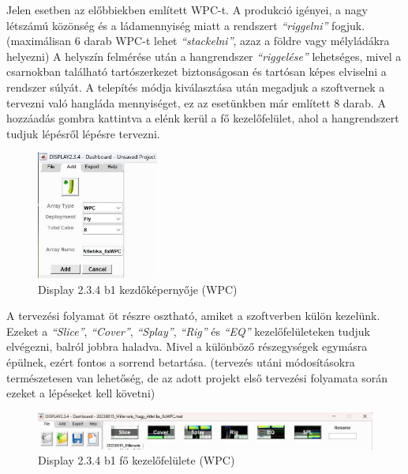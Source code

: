 Jelen esetben az előbbiekben említett WPC-t. A produkció igényei, a nagy létszámú közönség és a ládamennyiség miatt a rendszert
\textit{``riggelni''} fogjuk. (maximálisan 6 darab WPC-t lehet \textit{``stackelni''}, azaz a földre vagy mélyládákra helyezni)
A helyszín felmérése után a hangrendszer \textit{``riggelése''} lehetséges, mivel a csarnokban található tartószerkezet biztonságosan
és tartósan képes elviselni a rendszer súlyát.
A telepítés módja kiválasztása után megadjuk a szoftvernek a tervezni való hangláda mennyiséget, ez az esetünkben már említett 8 darab.
A hozzáadás gombra kattintva a elénk kerül a fő kezelőfelület, ahol a hangrendszert tudjuk lépésről lépésre tervezni.
\begin{figure}[H]
	\centering
	\includegraphics[width=40mm, keepaspectratio]{figures/display_wpc_0.jpg}
	\caption{Display 2.3.4 b1 kezdőképernyője (WPC)}\label{fig:display_wpc_0}
\end{figure}
A tervezési folyamat öt részre osztható, amiket a szoftverben külön kezelünk.
Ezeket a \textit{``Slice''}, \textit{``Cover''}, \textit{``Splay''}, \textit{``Rig''} és \textit{``EQ''} kezelőfelületeken tudjuk elvégezni,
balról jobbra haladva. Mivel a különböző részegységek egymásra épülnek, ezért fontos a sorrend betartása.
(tervezés utáni módosításokra természetesen van lehetőség, de az adott projekt első tervezési folyamata során ezeket a lépéseket kell követni)
\begin{figure}[H]
	\centering
	\includegraphics[width=\textwidth, keepaspectratio]{figures/display_wpc_0_1.jpg}
	\caption{Display 2.3.4 b1 fő kezelőfelülete (WPC)}\label{fig:display_wpc_0_1}
\end{figure}
